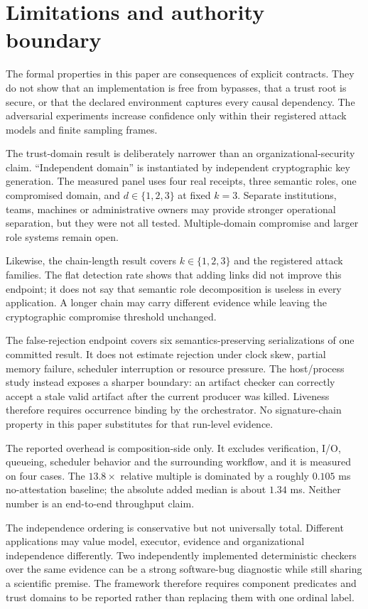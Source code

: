 \section{Limitations and authority boundary}

The formal properties in this paper are consequences of explicit contracts. They
do not show that an implementation is free from bypasses, that a trust root is
secure, or that the declared environment captures every causal dependency. The
adversarial experiments increase confidence only within their registered attack
models and finite sampling frames.

The trust-domain result is deliberately narrower than an organizational-security
claim. ``Independent domain'' is instantiated by independent cryptographic key
generation. The measured panel uses four real receipts, three semantic roles, one
compromised domain, and $d\in\{1,2,3\}$ at fixed $k=3$. Separate institutions,
teams, machines or administrative owners may provide stronger operational
separation, but they were not all tested. Multiple-domain compromise and larger
role systems remain open.

Likewise, the chain-length result covers $k\in\{1,2,3\}$ and the registered attack
families. The flat detection rate shows that adding links did not improve this
endpoint; it does not say that semantic role decomposition is useless in every
application. A longer chain may carry different evidence while leaving the
cryptographic compromise threshold unchanged.

The false-rejection endpoint covers six semantics-preserving serializations of one
committed result. It does not estimate rejection under clock skew, partial memory
failure, scheduler interruption or resource pressure. The host/process study
instead exposes a sharper boundary: an artifact checker can correctly accept a
stale valid artifact after the current producer was killed. Liveness therefore
requires occurrence binding by the orchestrator. No signature-chain property in
this paper substitutes for that run-level evidence.

The reported overhead is composition-side only. It excludes verification, I/O,
queueing, scheduler behavior and the surrounding workflow, and it is measured on
four cases. The $13.8\times$ relative multiple is dominated by a roughly
$0.105$ ms no-attestation baseline; the absolute added median is about $1.34$ ms.
Neither number is an end-to-end throughput claim.

The independence ordering is conservative but not universally total. Different
applications may value model, executor, evidence and organizational independence
differently. Two independently implemented deterministic checkers over the same
evidence can be a strong software-bug diagnostic while still sharing a scientific
premise. The framework therefore requires component predicates and trust domains
to be reported rather than replacing them with one ordinal label.

